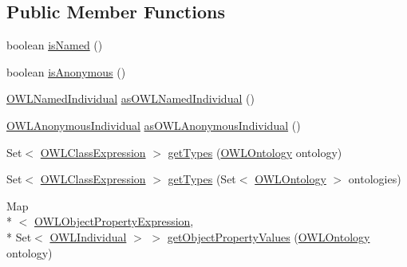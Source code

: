 \subsection*{Public Member Functions}
\begin{DoxyCompactItemize}
\item 
boolean \hyperlink{interfaceorg_1_1semanticweb_1_1owlapi_1_1model_1_1_o_w_l_individual_aaa8ad74eee31375a4110b38ce0272437}{is\-Named} ()
\item 
boolean \hyperlink{interfaceorg_1_1semanticweb_1_1owlapi_1_1model_1_1_o_w_l_individual_a82778dad1e17b3d72ebb55cb1cd1f66a}{is\-Anonymous} ()
\item 
\hyperlink{interfaceorg_1_1semanticweb_1_1owlapi_1_1model_1_1_o_w_l_named_individual}{O\-W\-L\-Named\-Individual} \hyperlink{interfaceorg_1_1semanticweb_1_1owlapi_1_1model_1_1_o_w_l_individual_ae9c9317f914ed6efb676f1b292a40f24}{as\-O\-W\-L\-Named\-Individual} ()
\item 
\hyperlink{interfaceorg_1_1semanticweb_1_1owlapi_1_1model_1_1_o_w_l_anonymous_individual}{O\-W\-L\-Anonymous\-Individual} \hyperlink{interfaceorg_1_1semanticweb_1_1owlapi_1_1model_1_1_o_w_l_individual_ae099296be44143ed5c2e2e098d4952f7}{as\-O\-W\-L\-Anonymous\-Individual} ()
\item 
Set$<$ \hyperlink{interfaceorg_1_1semanticweb_1_1owlapi_1_1model_1_1_o_w_l_class_expression}{O\-W\-L\-Class\-Expression} $>$ \hyperlink{interfaceorg_1_1semanticweb_1_1owlapi_1_1model_1_1_o_w_l_individual_ac34944ccbabbddd017a2aae334199156}{get\-Types} (\hyperlink{interfaceorg_1_1semanticweb_1_1owlapi_1_1model_1_1_o_w_l_ontology}{O\-W\-L\-Ontology} ontology)
\item 
Set$<$ \hyperlink{interfaceorg_1_1semanticweb_1_1owlapi_1_1model_1_1_o_w_l_class_expression}{O\-W\-L\-Class\-Expression} $>$ \hyperlink{interfaceorg_1_1semanticweb_1_1owlapi_1_1model_1_1_o_w_l_individual_a34fa4f5176b1e17d26dab521361907dc}{get\-Types} (Set$<$ \hyperlink{interfaceorg_1_1semanticweb_1_1owlapi_1_1model_1_1_o_w_l_ontology}{O\-W\-L\-Ontology} $>$ ontologies)
\item 
Map\\*
$<$ \hyperlink{interfaceorg_1_1semanticweb_1_1owlapi_1_1model_1_1_o_w_l_object_property_expression}{O\-W\-L\-Object\-Property\-Expression}, \\*
Set$<$ \hyperlink{interfaceorg_1_1semanticweb_1_1owlapi_1_1model_1_1_o_w_l_individual}{O\-W\-L\-Individual} $>$ $>$ \hyperlink{interfaceorg_1_1semanticweb_1_1owlapi_1_1model_1_1_o_w_l_individual_a485cbcc2cc7c406af56d50061a0232d9}{get\-Object\-Property\-Values} (\hyperlink{interfaceorg_1_1semanticweb_1_1owlapi_1_1model_1_1_o_w_l_ontology}{O\-W\-L\-Ontology} ontology)

\end{DoxyCompactItemize}
